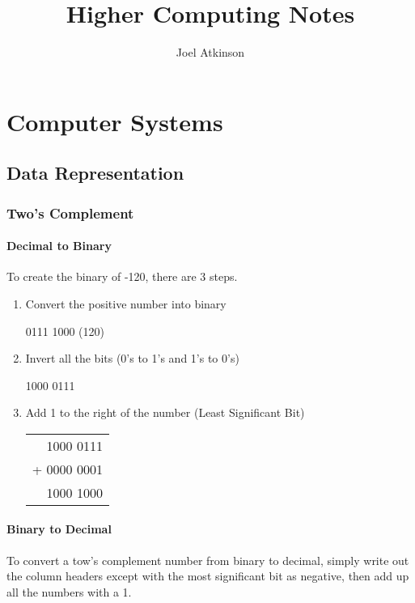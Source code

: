 \documentclass[a4paper, 12pt]{report}
\author{Joel Atkinson}
\title{Higher Computing Notes}
\date{}
\begin{document}
\maketitle

\tableofcontents

\chapter{Computer Systems}

\section{Data Representation}

\subsection{Two's Complement}

\subsubsection{Decimal to Binary}

To create the binary of -120, there are 3 steps.

\begin{enumerate}
\item Convert the positive number into binary

0111 1000 (120)

\item Invert all the bits (0's to 1's and 1's to 0's)
	
1000 0111

\item Add 1 to the right of the number (Least Significant Bit)

\begin{tabular}{r}
1000 0111 \\
+ 0000 0001 \\
\hline
1000 1000 \\
\end{tabular}
\end{enumerate}

\subsubsection{Binary to Decimal}

To convert a tow's complement number from binary to decimal, simply write out the column headers except with the most significant bit as negative, then add up all the numbers with a 1. \\
\end{document}
